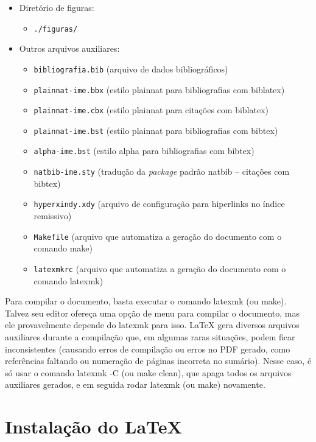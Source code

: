 \begin{itemize}
  \item Diretório de figuras:
  \begin{itemize}
    \item \texttt{./figuras/}
  \end{itemize}

  \item Outros arquivos auxiliares:
  \begin{itemize}
    \item \texttt{bibliografia.bib} (arquivo de dados bibliográficos)
    \item \texttt{plainnat-ime.bbx} (estilo plainnat para bibliografias com biblatex)
    \item \texttt{plainnat-ime.cbx} (estilo plainnat para citações com biblatex)
    \item \texttt{plainnat-ime.bst} (estilo plainnat para bibliografias com bibtex)
    \item \texttt{alpha-ime.bst} (estilo alpha para bibliografias com bibtex)
    \item \texttt{natbib-ime.sty} (tradução da \textit{package} padrão natbib -- citações com bibtex)
    \item \texttt{hyperxindy.xdy} (arquivo de configuração para hiperlinks no índice remissivo)
    \item \texttt{Makefile} (arquivo que automatiza a geração do documento com o comando \textsf{make})
    \item \texttt{latexmkrc} (arquivo que automatiza a geração do documento com o comando \textsf{latexmk})
  \end{itemize}
\end{itemize}

Para compilar o documento, basta executar o comando \textsf{latexmk} (ou
\textsf{make}). Talvez seu editor ofereça uma opção de menu para compilar o
documento, mas ele provavelmente depende do \textsf{latexmk} para isso.
\LaTeX{} gera diversos arquivos auxiliares durante a compilação que, em
algumas raras situações, podem ficar inconsistentes (causando erros de
compilação ou erros no PDF gerado, como referências faltando ou numeração de
páginas incorreta no sumário). Nesse caso, é só usar o comando
\textsf{latexmk -C} (ou \textsf{make clean}), que apaga todos os arquivos
auxiliares gerados, e em seguida rodar \textsf{latexmk} (ou \textsf{make})
novamente.

\section{Instalação do \LaTeX{}}

